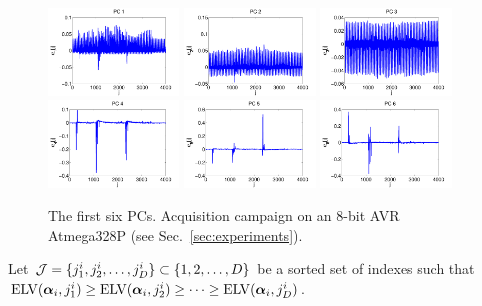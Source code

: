 \begin{figure}
\includegraphics[width=0.31\textwidth]{figures/PC1.pdf} 
\includegraphics[width=0.31\textwidth]{figures/PC2.pdf} 
\includegraphics[width=0.31\textwidth]{figures/PC3.pdf} \\
\includegraphics[width=0.31\textwidth]{figures/PC4.pdf} 
\includegraphics[width=0.31\textwidth]{figures/PC5.pdf} 
\includegraphics[width=0.31\textwidth]{figures/PC6.pdf} 
\caption{The first six PCs. Acquisition campaign on an 8-bit AVR Atmega328P (see Sec.~\ref{sec:experiments}).}\label{fig:6components}
\end{figure}
Let $\mathcal{J}=\{j^i_1, j^i_2, \dots, j^i_{D}\}\subset\{1,2,\dots,D\}$ be a sorted set of indexes such that $\mathrm{ELV}(\boldsymbol\alpha_i,j^i_1)\geq \mathrm{ELV}(\boldsymbol\alpha_i,j^i_2)\geq \dots \geq \mathrm{ELV}(\boldsymbol\alpha_i,j^i_D)$.
